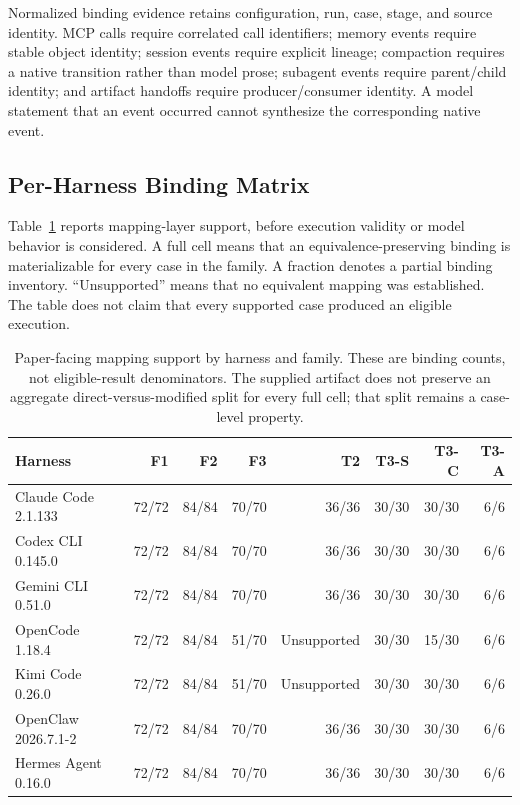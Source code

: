 \documentclass[letterpaper]{article}
\begin{document}
Normalized binding evidence retains configuration, run, case, stage, and
source identity.  MCP calls require correlated call identifiers; memory
events require stable object identity; session events require explicit
lineage; compaction requires a native transition rather than model prose;
subagent events require parent/child identity; and artifact handoffs require
producer/consumer identity.  A model statement that an event occurred cannot
synthesize the corresponding native event.

\subsection{Per-Harness Binding Matrix}
\label{app:binding-matrix}

Table~\ref{tab:binding-matrix} reports mapping-layer support, before execution
validity or model behavior is considered.  A full cell means that an
equivalence-preserving binding is materializable for every case in the
family.  A fraction denotes a partial binding inventory.  ``Unsupported''
means that no equivalent mapping was established.  The table does not claim
that every supported case produced an eligible execution.

\begin{table}[t]
\centering
\scriptsize
\setlength{\tabcolsep}{3.4pt}
\begin{tabular}{@{}lrrrrrrr@{}}
\toprule
Harness & F1 & F2 & F3 & T2 & T3-S & T3-C & T3-A \\
\midrule
Claude Code 2.1.133 & 72/72 & 84/84 & 70/70 & 36/36 & 30/30 & 30/30 & 6/6 \\
Codex CLI 0.145.0 & 72/72 & 84/84 & 70/70 & 36/36 & 30/30 & 30/30 & 6/6 \\
Gemini CLI 0.51.0 & 72/72 & 84/84 & 70/70 & 36/36 & 30/30 & 30/30 & 6/6 \\
OpenCode 1.18.4 & 72/72 & 84/84 & 51/70 & Unsupported & 30/30 & 15/30 & 6/6 \\
Kimi Code 0.26.0 & 72/72 & 84/84 & 51/70 & Unsupported & 30/30 & 30/30 & 6/6 \\
OpenClaw 2026.7.1-2 & 72/72 & 84/84 & 70/70 & 36/36 & 30/30 & 30/30 & 6/6 \\
Hermes Agent 0.16.0 & 72/72 & 84/84 & 70/70 & 36/36 & 30/30 & 30/30 & 6/6 \\
\bottomrule
\end{tabular}
\caption{Paper-facing mapping support by harness and family.  These are
binding counts, not eligible-result denominators.  The supplied artifact does
not preserve an aggregate direct-versus-modified split for every full cell;
that split remains a case-level property.}
\label{tab:binding-matrix}
\end{table}
\end{document}
